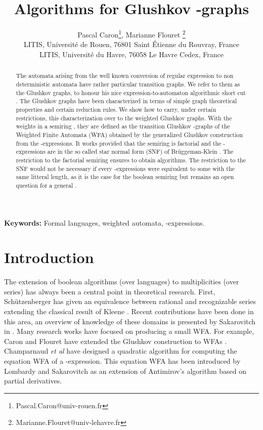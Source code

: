 \documentclass[11pt]{article}
\title{\Large\bf Algorithms for Glushkov -graphs}
\author{
Pascal {\sc
Caron}\thanks{Pascal.Caron@univ-rouen.fr}, Marianne
{\sc Flouret} \thanks{Marianne.Flouret@univ-lehavre.fr}
\\ LITIS,
Universit\'e de Rouen, 76801
Saint \'Etienne du Rouvray, France \\ LITIS, Universit\'e du Havre, 76058  Le
Havre Cedex, France
}
\begin{document}
\maketitle
\begin{abstract}
The automata arising from the well known conversion of regular expression to non deterministic automata have rather 
particular transition graphs. We refer to them as the Glushkov graphs, to honour his nice expression-to-automaton 
algorithmic short cut \cite{Glu61}. The Glushkov graphs have been characterized \cite{CZ97} in terms of simple graph 
theoretical properties and certain reduction rules. We show how to carry, under certain restrictions, this 
characterization over to the weighted Glushkov graphs. With the weights in a semiring , they are defined as the transition 
Glushkov -graphs of the Weighted Finite Automata (WFA) obtained by the generalized Glushkov construction \cite{CF03}  from the -expressions. It works provided that the semiring  is factorial and the -expressions are in the
 so called star normal form (SNF) of Br\"uggeman-Klein \cite{Bru93}. The restriction to the factorial semiring ensures to obtain algorithms. The restriction to the SNF would not be necessary 
if every -expressions were equivalent to some with the same litteral length, as it is the case for the 
boolean semiring  but remains an open question for a general .  
\end{abstract}
{\scriptsize {\bf Keywords: } Formal languages, weighted automata, -expressions.}


\section{Introduction}
The extension of boolean algorithms (over languages) to multiplicities
(over series)
has always been a central point in theoretical research. First,
Sch\"utzenberger \cite{Sch61.1} has given an equivalence between rational
and
recognizable series extending the classical result of Kleene \cite{Kle56}.
Recent contributions have been done in this area, an overview of knowledge of these domains is presented by Sakarovitch 
in \cite{Sak03}.
 Many research works have focused on producing a small WFA. For example, Caron and Flouret have extended the Glushkov construction to WFAs \cite{CF03}.
Champarnaud {\it et al} have designed a quadratic algorithm \cite{COZ09} for computing the equation WFA of a -expression. This equation WFA has been introduced by Lombardy and Sakarovitch as an extension of Antimirov's algorithm  \cite{LS01} based on partial derivatives.
\end{document}
